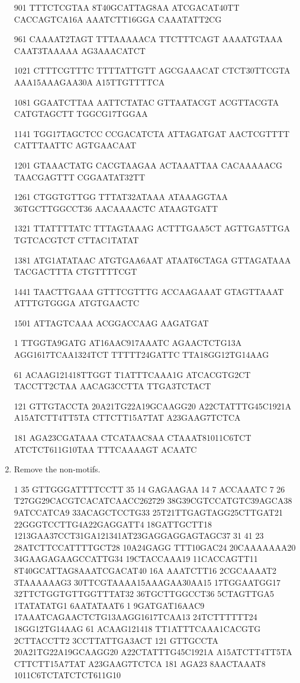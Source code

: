 \begin{enumerate}
{901    TTTCTCGTAA 8T40GCATTAG8AA ATCGACAT40TT CACCAGTCA16A AAATCTT16GGA CAAATATT2CG

961    CAAAAT2TAGT TTTAAAAACA TTCTTTCAGT AAAATGTAAA CAAT3TAAAAA AG3AAACATCT

1021   CTTTCGTTTC TTTTATTGTT AGCGAAACAT CTCT30TTCGTA AAA15AAAGAA30A A15TTGTTTTCA

1081   GGAATCTTAA AATTCTATAC GTTAATACGT ACGTTACGTA CATGTAGCTT TGGCG17TGGAA

1141   TGG17TAGCTCC CCGACATCTA ATTAGATGAT AACTCGTTTT CATTTAATTC AGTGAACAAT

1201   GTAAACTATG CACGTAAGAA ACTAAATTAA CACAAAAACG TAACGAGTTT CGGAATAT32TT

1261   CTGGTGTTGG TTTAT32ATAAA ATAAAGGTAA 36TGCTTGGCCT36 AACAAAACTC ATAAGTGATT

1321   TTATTTTATC TTTAGTAAAG ACTTTGAA5CT AGTTGA5TTGA TGTCACGTCT CTTAC1TATAT

1381   ATG1ATATAAC ATGTGAA6AAT ATAAT6CTAGA GTTAGATAAA TACGACTTTA CTGTTTTCGT

1441   TAACTTGAAA GTTTCGTTTG ACCAAGAAAT GTAGTTAAAT ATTTGTGGGA ATGTGAACTC

1501   ATTAGTCAAA ACGGACCAAG AAGATGAT

1      TTGGTA9GATG AT16AAC917AAATC AGAACTCTG13A AGG1617TCAA1324TCT TTTTT24GATTC TTA18GG12TG14AAG

61     ACAAG121418TTGGT T1ATTTCAAA1G ATCACGTG2CT TACCTT2CTAA AACAG3CCTTA TTGA3TCTACT

121    GTTGTACCTA 20A21TG22A19GCAAGG20 A22CTATTTG45C1921A A15ATCTT4TT5TA CTTCTT15A7TAT A23GAAG7TCTCA

181    AGA23CGATAAA CTCATAAC8AA CTAAAT81011C6TCT ATCTCT611G10TAA TTTCAAAAGT ACAATC}

\item Remove the non-motifs.

{\tiny

1  35 GTTGGGATTTTCCTT 35 14 GAGAAGAA 14 7 ACCAAATC 7 26 T27GG29CACGTCACATCAACC262729 38G39CGTCCATGTC39AGCA38 9ATCCATCA9 33ACAGCTCCTG33 
25T21TTGAGTAGG25CTTGAT21 22GGGTCCTTG4A22GAGGATT4 18GATTGCTT18 1213GAA37CCT31GA121341AT23GAGGAGGAGTAGC37 31 41 23 28ATCTTCCATTTTGCT28 10A24GAGG TTT10GAC24 20CAAAAAAA20 34GAAGAGAAGCCATTG34 19CTACCAAA19 11CACCAGTT11 8T40GCATTAG8AAATCGACAT40 16A AAATCTT16 2CGCAAAAT2 3TAAAAAAG3 30TTCGTAAAA15AAAGAA30AA15 17TGGAATGG17 32TTCTGGTGTTGGTTTAT32 36TGCTTGGCCT36 5CTAGTTGA5 1TATATATG1 6AATATAAT6
1      9GATGAT16AAC9 17AAATCAGAACTCTG13AAGG1617TCAA13 24TCTTTTTT24 18GG12TG14AAG
61     ACAAG121418 TT1ATTTCAAA1CACGTG 2CTTACCTT2 3CCTTATTGA3ACT
121    GTTGCCTA 20A21TG22A19GCAAGG20 A22CTATTTG45C1921A A15ATCTT4TT5TA CTTCTT15A7TAT A23GAAG7TCTCA
181    AGA23 8AACTAAAT8 1011C6TCTATCTCT611G10 }


\end{enumerate}
